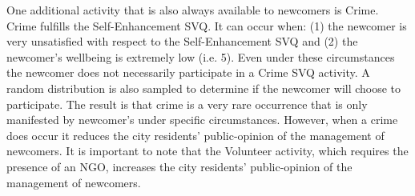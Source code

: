 \documentclass{scspaperproc}
\theoremstyle{scsthe}
\begin{document}
One additional activity that is also always available to newcomers is Crime. Crime fulfills the Self-Enhancement SVQ. It can occur when: (1) the newcomer is very unsatisfied with respect to the Self-Enhancement SVQ and (2) the newcomer's wellbeing is extremely low (i.e. 5). Even under these circumstances the newcomer does not necessarily participate in a Crime SVQ activity. A random distribution is also sampled to determine if the newcomer will choose to participate. The result is that crime is a very rare occurrence that is only manifested by newcomer's under specific circumstances. However, when a crime does occur it reduces the city residents' public-opinion of the management of newcomers. It is important to note that the Volunteer activity, which requires the presence of an NGO, increases the city residents' public-opinion of the management of newcomers.
\end{document}
